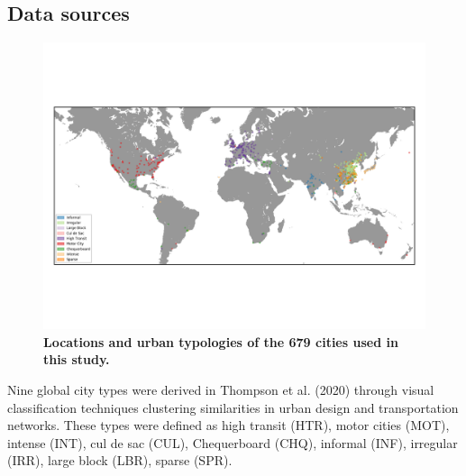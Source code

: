 \documentclass[preprint,12pt]{elsarticle}
\begin{document}
\subsection*{Data sources}


\begin{figure}
\centering
\includegraphics[trim={13 78 13 78},clip,scale=0.9]{Images/WorldPollutionClusters.png}
\caption{\bf Locations and urban typologies of the 679 cities used in this study.}
 \label{fig:clusters}
\end{figure}

Nine global city types were derived in Thompson et al. (2020) \cite{Thompson2020} through visual classification techniques clustering similarities in urban design and transportation networks. These types were defined as high transit (HTR), motor cities (MOT), intense (INT), cul de sac (CUL), Chequerboard (CHQ), informal (INF), irregular (IRR), large block (LBR), sparse (SPR). 
\end{document}
